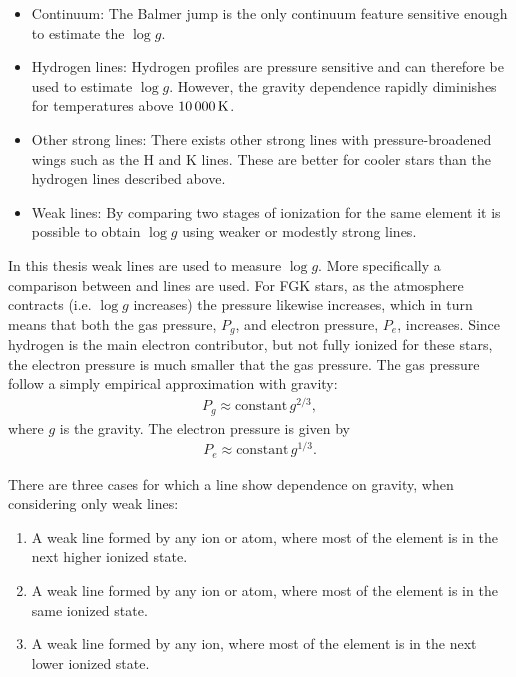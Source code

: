 \begin{itemize}
  \item Continuum: The Balmer jump is the only continuum feature sensitive enough to estimate the
        $\log g$.
  \item Hydrogen lines: Hydrogen profiles are pressure sensitive and can therefore be used to
        estimate $\log g$. However, the gravity dependence rapidly diminishes for temperatures above
        $\SI{10\,000}{K}$.
  \item Other strong lines: There exists other strong lines with pressure-broadened wings such as
        the  H and K lines. These are better for cooler stars than the hydrogen lines
        described above.
  \item Weak lines: By comparing two stages of ionization for the same element it is possible to
        obtain $\log g$ using weaker or modestly strong lines.
\end{itemize}
In this thesis weak lines are used to measure $\log g$. More specifically a comparison between
 and  lines are used. For FGK stars, as the atmosphere contracts (i.e. $\log
g$ increases) the pressure likewise increases, which in turn means that both the gas pressure,
$P_g$, and electron pressure, $P_e$, increases. Since hydrogen is the main electron contributor, but
not fully ionized for these stars, the electron pressure is much smaller that the gas pressure. The
gas pressure follow a simply empirical approximation with gravity:
\begin{align}
  P_g \approx \mathrm{constant}\, g^{2/3},
\end{align}
where $g$ is the gravity. The electron pressure is given by
\begin{align}
  P_e \approx \mathrm{constant}\, g^{1/3}.
\end{align}

There are three cases for which a line show dependence on gravity, when considering only weak lines:
\begin{enumerate}
  \item A weak line formed by any ion or atom, where most of the element is in the next higher ionized state.
  \item A weak line formed by any ion or atom, where most of the element is in the same ionized state.
  \item A weak line formed by any ion, where most of the element is in the next lower ionized state.
\end{enumerate}

